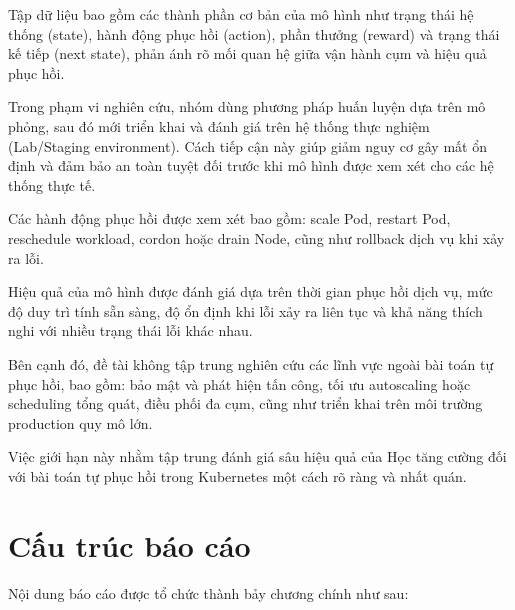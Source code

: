 Tập dữ liệu bao gồm các thành phần cơ bản của mô hình như trạng thái hệ thống (state),
hành động phục hồi (action), phần thưởng (reward) và trạng thái kế tiếp (next state),
phản ánh rõ mối quan hệ giữa vận hành cụm và hiệu quả phục hồi.

Trong phạm vi nghiên cứu, nhóm dùng phương pháp huấn luyện dựa trên mô phỏng,
sau đó mới triển khai và đánh giá trên hệ thống thực nghiệm (Lab/Staging environment). 
Cách tiếp cận này giúp giảm nguy cơ gây mất ổn định và đảm bảo an toàn tuyệt đối
trước khi mô hình được xem xét cho các hệ thống thực tế.

Các hành động phục hồi được xem xét bao gồm: scale Pod, restart Pod,
reschedule workload, cordon hoặc drain Node, cũng như rollback dịch vụ khi xảy ra lỗi.

Hiệu quả của mô hình được đánh giá dựa trên thời gian phục hồi dịch vụ,
mức độ duy trì tính sẵn sàng, độ ổn định khi lỗi xảy ra liên tục
và khả năng thích nghi với nhiều trạng thái lỗi khác nhau.

Bên cạnh đó, đề tài không tập trung nghiên cứu các lĩnh vực ngoài bài toán tự phục hồi,
bao gồm: bảo mật và phát hiện tấn công, tối ưu autoscaling hoặc scheduling tổng quát,
điều phối đa cụm, cũng như triển khai trên môi trường production quy mô lớn.

Việc giới hạn này nhằm tập trung đánh giá sâu hiệu quả của Học tăng cường
đối với bài toán tự phục hồi trong Kubernetes một cách rõ ràng và nhất quán.

\section{Cấu trúc báo cáo}

Nội dung báo cáo được tổ chức thành bảy chương chính như sau:

